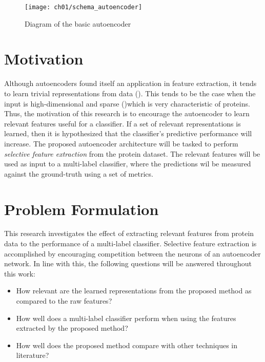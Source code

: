 \begin{figure}[!t]
  \centering
  \texttt{[image: ch01/schema\_autoencoder]}
  \caption[Diagram of the basic autoencoder]{
      Diagram of the basic autoencoder
  }
  \label{schema:autoencoder}
\end{figure}

\section{Motivation}
\label{Motivation}

Although autoencoders found itself an application in feature extraction, it tends to learn 
trivial representations from data (\cite{wang2017feature, chen2017kate}). This
tends to be the case when the input is high-dimensional and sparse
(\cite{zhai2016semisupervised})\textemdash which is very characteristic of proteins.
Thus, the motivation of this research is to encourage the autoencoder to learn
relevant features useful for a classifier. If a set of relevant representations
is learned, then it is hypothesized that the classifier's predictive
performance will increase. The proposed autoencoder architecture will be tasked to perform
\textit{selective feature extraction} from the protein dataset. The relevant
features will be used as input to a multi-label classifier, where the
predictions wil be measured against the ground-truth using a set of metrics.



\section{Problem Formulation}
\label{Problem}

This research investigates the effect of extracting relevant features from
protein data to the performance of a multi-label classifier. Selective feature
extraction is accomplished by encouraging competition between the neurons of an
autoencoder network. In line with this, the following questions will be
answered throughout this work:

\begin{itemize}
    \item How relevant are the learned representations from the proposed method
        as compared to the raw features?
    \item How well does a multi-label classifier perform when using the
        features extracted by the proposed method?
    \item How well does the proposed method compare with other techniques in
        literature?
\end{itemize}

